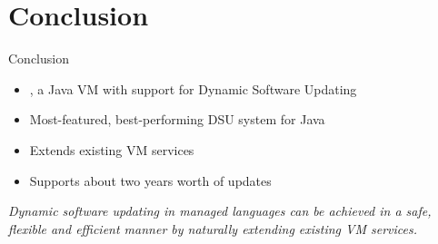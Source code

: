 
\section{Conclusion}
\ShowTOC

\begin{frame}{Conclusion}%
\begin{itemize}
\item \DSU{}, a Java VM with support for Dynamic Software Updating
\item Most-featured, best-performing DSU system for Java
\item Extends existing VM services
\item Supports about two years worth of updates
\end{itemize}
\begin{block}{}
\emph{Dynamic software updating in managed languages can be achieved in a
safe, flexible and efficient manner by naturally extending existing VM
services.}
\end{block}
\end{frame}
